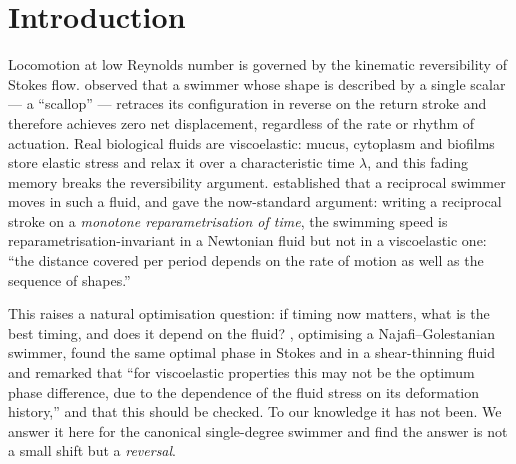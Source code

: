 \documentclass[11pt]{article}
\begin{document}
\section{Introduction}
Locomotion at low Reynolds number is governed by the kinematic reversibility of Stokes flow.
\citet{purcell1977} observed that a swimmer whose shape is described by a single scalar --- a
``scallop'' --- retraces its configuration in reverse on the return stroke and therefore achieves
zero net displacement, regardless of the rate or rhythm of actuation. Real biological fluids are
viscoelastic: mucus, cytoplasm and biofilms store elastic stress and relax it over a
characteristic time $\lambda$, and this fading memory breaks the reversibility argument.
\citet{lauga2007,fu2009} established that a reciprocal swimmer moves in such a fluid, and
\citet{fu2009} gave the now-standard argument: writing a reciprocal stroke on a
\emph{monotone reparametrisation of time}, the swimming speed is reparametrisation-invariant in a
Newtonian fluid but not in a viscoelastic one: ``the distance covered per period depends on the
rate of motion as well as the sequence of shapes.''

This raises a natural optimisation question: if timing now matters, what is
the best timing, and does it depend on the fluid? \citet{mj2012}, optimising a
Najafi--Golestanian swimmer, found the same optimal phase in Stokes and in a shear-thinning fluid
and remarked that ``for viscoelastic properties this may not be the optimum phase difference, due
to the dependence of the fluid stress on its deformation history,'' and that this should be
checked. To our knowledge it has not been. We answer it here for the canonical single-degree
swimmer and find the answer is not a small shift but a \emph{reversal}.
\end{document}
